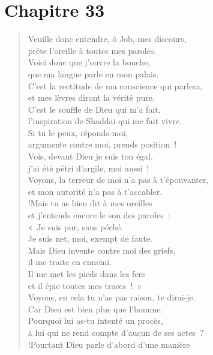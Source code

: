 \documentclass[french,twoside]{book} %
\def\mednobreak{\ifdim\lastskip<\medskipamount
  \removelastskip\nopagebreak\medskip\fi}
\newcommand{\labelblock}[1]{\medbreak{\noindent\color{rubric}\bfseries #1}\par\mednobreak}
\newcommand\chapteropen{} %
\newcommand\chaptercont{} %
\begin{document}
\chapteropen
\chapter[Chapitre 33]{Chapitre 33}\renewcommand{\leftmark}{Chapitre 33}


\chaptercont

\labelblock{L’intercesseur}


\begin{verse}
Veuille donc entendre, ô Job, mes discours, \\
prête l’oreille à toutes mes paroles.\\
Voici donc que j’ouvre la bouche, \\
que ma langue parle en mon palais.\\
C’est la rectitude de ma conscience qui parlera, \\
et mes lèvres diront la vérité pure.\\
C’est le souffle de Dieu qui m’a fait, \\
l’inspiration de Shaddaï qui me fait vivre.\\
Si tu le peux, réponds-moi, \\
argumente contre moi, prends position !\\
Vois, devant Dieu je suis ton égal, \\
j’ai été pétri d’argile, moi aussi !\\
Voyons, la terreur de moi n’a pas à t’épouvanter, \\
et mon autorité n’a pas à t’accabler.\\!Mais tu as bien dit à mes oreilles \\
et j’entends encore le son des paroles :\\
« Je suis pur, sans péché. \\
Je suis net, moi, exempt de faute.\\
Mais Dieu invente contre moi des griefs, \\
il me traite en ennemi.\\
Il me met les pieds dans les fers \\
et il épie toutes mes traces ! »\\
Voyons, en cela tu n’as pas raison, te dirai-je. \\
Car Dieu est bien plus que l’homme.\\
Pourquoi lui as-tu intenté un procès, \\
à lui qui ne rend compte d’aucun de ses actes ?\\!Pourtant Dieu parle d’abord d’une manière \\

\end{verse}
\end{document}
